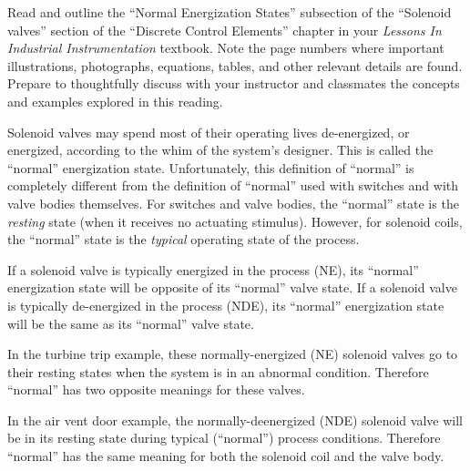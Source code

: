 
Read and outline the ``Normal Energization States'' subsection of the ``Solenoid valves'' section of the ``Discrete Control Elements'' chapter in your {\it Lessons In Industrial Instrumentation} textbook.  Note the page numbers where important illustrations, photographs, equations, tables, and other relevant details are found.  Prepare to thoughtfully discuss with your instructor and classmates the concepts and examples explored in this reading.













Solenoid valves may spend most of their operating lives de-energized, or energized, according to the whim of the system's designer.  This is called the ``normal'' energization state.  Unfortunately, this definition of ``normal'' is completely different from the definition of ``normal'' used with switches and with valve bodies themselves.  For switches and valve bodies, the ``normal'' state is the {\it resting} state (when it receives no actuating stimulus).  However, for solenoid coils, the ``normal'' state is the {\it typical} operating state of the process. 

\vskip 10pt

If a solenoid valve is typically energized in the process (NE), its ``normal'' energization state will be opposite of its ``normal'' valve state.  If a solenoid valve is typically de-energized in the process (NDE), its ``normal'' energization state will be the same as its ``normal'' valve state.

\vskip 10pt

In the turbine trip example, these normally-energized (NE) solenoid valves go to their resting states when the system is in an abnormal condition.  Therefore ``normal'' has two opposite meanings for these valves.

\vskip 10pt

In the air vent door example, the normally-deenergized (NDE) solenoid valve will be in its resting state during typical (``normal'') process conditions.  Therefore ``normal'' has the same meaning for both the solenoid coil and the valve body.





